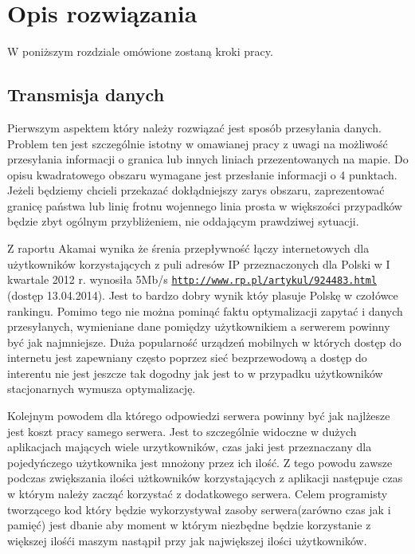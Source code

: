 \chapter{Opis rozwiązania}
\label{cha:Opis rozwiązania}

W poniższym rozdziale omówione zostaną kroki pracy.

\section{Transmisja danych}
\label{sec:transmisjaDanych}

Pierwszym aspektem który należy rozwiązać jest sposób przesyłania danych. Problem ten jest szczególnie istotny w omawianej pracy z uwagi na możliwość przesyłania informacji o granica lub innych liniach przezentowanych na mapie. Do opisu kwadratowego obszaru wymagane jest przesłanie informacji o 4 punktach. Jeżeli będziemy chcieli przekazać dokłądniejszy zarys obszaru, zaprezentować granicę państwa lub linię frotnu wojennego linia prosta w większości przypadków będzie zbyt ogólnym przybliżeniem, nie oddającym prawdziwej sytuacji. 

Z raportu Akamai wynika że śrenia przepływność łączy internetowych dla użytkowników korzystających z puli adresów IP przeznaczonych dla Polski w I kwartale 2012 r. wynosiła 5Mb/s  \underline{\texttt{http://www.rp.pl/artykul/924483.html}} (dostęp 13.04.2014). Jest to bardzo dobry wynik któy plasuje Polskę w czołówce rankingu. Pomimo tego nie można pominąć faktu optymalizacji zapytać i danych przesyłanych, wymieniane dane pomiędzy użytkownikiem a serwerem powinny być jak najmniejsze. Duża popularność urządzeń mobilnych w których dostęp do internetu jest zapewniany często poprzez sieć bezprzewodową a dostęp do interentu nie jest jeszcze tak dogodny jak jest to w przypadku użytkowników stacjonarnych  wymusza optymalizację.

Kolejnym powodem dla którego odpowiedzi serwera powinny być jak najlżesze jest koszt pracy samego serwera. Jest to szczególnie widoczne w dużych aplikacjach mających wiele urzytkowników, czas jaki jest przeznaczany dla pojedyńczego użytkownika jest mnożony przez ich ilość. Z tego powodu zawsze podczas zwiększania ilości użtkowników korzystających z aplikacji następuje czas w którym należy zacząć korzystać z dodatkowego serwera. Celem programisty tworzącego kod który będzie wykorzystywał zasoby serwera(zarówno czas jak i pamięć) jest dbanie aby moment w którym niezbędne będzie korzystanie z większej ilośći maszym nastąpił przy jak największej ilości użytkowników.

